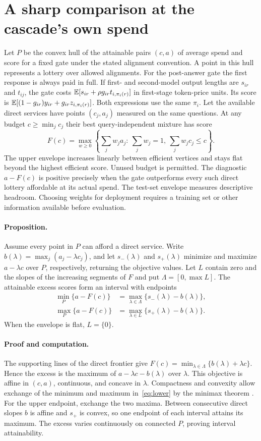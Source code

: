 \section{A sharp comparison at the cascade's own spend}\label{sec:spend}
Let $P$ be the convex hull of the attainable pairs $(c,a)$ of average spend and score for a fixed gate under the stated alignment convention. A point in this hull represents a lottery over allowed alignments. For the post-answer gate the first response is always paid in full. If first- and second-model output lengths are $s_{ir}$ and $t_{ij}$, the gate costs $\mathbb E[s_{ir}+\rho g_{ir}t_{i,\pi_i(r)}]$ in first-stage token-price units. Its score is $\mathbb E[(1-g_{ir})y_{ir}+g_{ir}z_{i,\pi_i(r)}]$. Both expressions use the same $\pi_i$. Let the available direct services have points $(c_j,a_j)$ measured on the same questions. At any budget $c\ge\min_j c_j$ their best query-independent mixture has score
\[
 F(c)=\max_{w\ge0}\left\{\sum_j w_j a_j:\ \sum_jw_j=1,\ \sum_j w_jc_j\le c\right\}.
\]
The upper envelope increases linearly between efficient vertices and stays flat beyond the highest efficient score. Unused budget is permitted. The diagnostic $a-F(c)$ is positive precisely when the gate outperforms every such direct lottery affordable at its actual spend. The test-set envelope measures descriptive headroom. Choosing weights for deployment requires a training set or other information available before evaluation.

\paragraph{Proposition.} Assume every point in $P$ can afford a direct service. Write $b(\lambda)=\max_j(a_j-\lambda c_j)$, and let $s_-(\lambda)$ and $s_+(\lambda)$ minimize and maximize $a-\lambda c$ over $P$, respectively, returning the objective values. Let $L$ contain zero and the slopes of the increasing segments of $F$ and put $\Lambda=[0,\max L]$. The attainable excess scores form an interval with endpoints
\begin{align}
 \min_P \{a-F(c)\}&=\max_{\lambda\in\Lambda}\{s_-(\lambda)-b(\lambda)\}, \label{eq:lower}\\
 \max_P \{a-F(c)\}&=\max_{\lambda\in L}\{s_+(\lambda)-b(\lambda)\}. \label{eq:upper}
\end{align}
When the envelope is flat, $L=\{0\}$.

\paragraph{Proof and computation.} The supporting lines of the direct frontier give $F(c)=\min_{\lambda\in\Lambda}\{b(\lambda)+\lambda c\}$. Hence the excess is the maximum of $a-\lambda c-b(\lambda)$ over $\lambda$. This objective is affine in $(c,a)$, continuous, and concave in $\lambda$. Compactness and convexity allow exchange of the minimum and maximum in~\eqref{eq:lower} by the minimax theorem \cite{sion}. For the upper endpoint, exchange the two maxima. Between consecutive direct slopes $b$ is affine and $s_+$ is convex, so one endpoint of each interval attains its maximum. The excess varies continuously on connected $P$, proving interval attainability.

